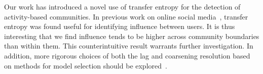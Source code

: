 \documentclass[letterpaper]{article}
\begin{document}



Our work has introduced a novel use of transfer entropy for the detection of activity-based communities. In previous work on online social media~\cite{ver2012information}, transfer entropy was found useful for identifying influence between users. It is thus interesting that we find influence tends to be higher across community boundaries than within them. This counterintuitive result warrants further investigation. In addition, more rigorous choices of both the lag and coarsening resolution based on methods for model selection should be explored~\cite{claeskens2008model}.
\end{document}
